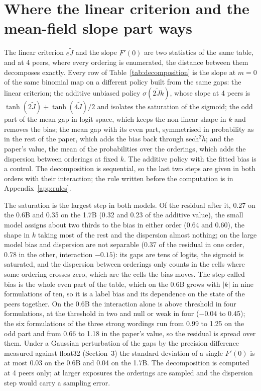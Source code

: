 \documentclass[11pt]{article}
\begin{document}
\section{Where the linear criterion and the mean-field slope part ways}
\label{app:decomposition}

The linear criterion $e\tilde J$ and the slope $F'(0)$ are two statistics of the same table, and at 4 peers, where every ordering is enumerated, the distance between them decomposes exactly. Every row of Table~\ref{tab:decomposition} is the slope at $m=0$ of the same binomial map on a different policy built from the same gaps: the linear criterion; the additive unbiased policy $\sigma(2\tilde J k)$, whose slope at 4 peers is $\tanh(2\tilde J) + \tanh(4\tilde J)/2$ and isolates the saturation of the sigmoid; the odd part of the mean gap in logit space, which keeps the non-linear shape in $k$ and removes the bias; the mean gap with its even part, symmetrised in probability as in the rest of the paper, which adds the bias back through $\mathrm{sech}^2\tilde h$; and the paper's value, the mean of the probabilities over the orderings, which adds the dispersion between orderings at fixed $k$. The additive policy with the fitted bias is a control. The decomposition is sequential, so the last two steps are given in both orders with their interaction; the rule written before the computation is in Appendix~\ref{app:rules}.

The saturation is the largest step in both models. Of the residual after it, 0.27 on the 0.6B and 0.35 on the 1.7B (0.32 and 0.23 of the additive value), the small model assigns about two thirds to the bias in either order (0.64 and 0.60), the shape in $k$ taking most of the rest and the dispersion almost nothing; on the large model bias and dispersion are not separable (0.37 of the residual in one order, 0.78 in the other, interaction $-0.15$): its gaps are tens of logits, the sigmoid is saturated, and the dispersion between orderings only counts in the cells where some ordering crosses zero, which are the cells the bias moves. The step called bias is the whole even part of the table, which on the 0.6B grows with $|k|$ in nine formulations of ten, so it is a label bias and its dependence on the state of the peers together. On the 0.6B the interaction alone is above threshold in four formulations, at the threshold in two and null or weak in four ($-0.04$ to 0.45); the six formulations of the three strong wordings run from 0.99 to 1.25 on the odd part and from 0.66 to 1.18 in the paper's value, so the residual is spread over them. Under a Gaussian perturbation of the gaps by the precision difference measured against float32 (Section~3) the standard deviation of a single $F'(0)$ is at most 0.03 on the 0.6B and 0.04 on the 1.7B. The decomposition is computed at 4 peers only; at larger exposures the orderings are sampled and the dispersion step would carry a sampling error.
\end{document}
